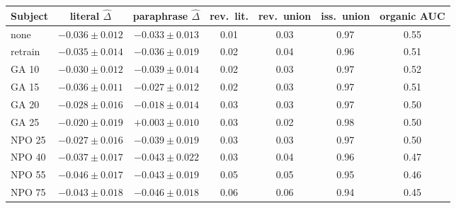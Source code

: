 \begin{tabular}{lcccccc}
\toprule
Subject & literal $\hat\Delta$ & paraphrase $\hat\Delta$ & rev.\ lit. & rev.\ union & iss.\ union & organic AUC \\
\midrule
none & $-0.036\pm0.012$ & $-0.033\pm0.013$ & 0.01 & 0.03 & 0.97 & 0.55 \\
retrain & $-0.035\pm0.014$ & $-0.036\pm0.019$ & 0.02 & 0.04 & 0.96 & 0.51 \\
\midrule
GA 10 & $-0.030\pm0.012$ & $-0.039\pm0.014$ & 0.02 & 0.03 & 0.97 & 0.52 \\
GA 15 & $-0.036\pm0.011$ & $-0.027\pm0.012$ & 0.02 & 0.03 & 0.97 & 0.51 \\
GA 20 & $-0.028\pm0.016$ & $-0.018\pm0.014$ & 0.03 & 0.03 & 0.97 & 0.50 \\
GA 25 & $-0.020\pm0.019$ & $+0.003\pm0.010$ & 0.03 & 0.02 & 0.98 & 0.50 \\
NPO 25 & $-0.027\pm0.016$ & $-0.039\pm0.019$ & 0.03 & 0.03 & 0.97 & 0.50 \\
NPO 40 & $-0.037\pm0.017$ & $-0.043\pm0.022$ & 0.03 & 0.04 & 0.96 & 0.47 \\
NPO 55 & $-0.046\pm0.017$ & $-0.043\pm0.019$ & 0.05 & 0.05 & 0.95 & 0.46 \\
NPO 75 & $-0.043\pm0.018$ & $-0.046\pm0.018$ & 0.06 & 0.06 & 0.94 & 0.45 \\
\bottomrule
\end{tabular}
